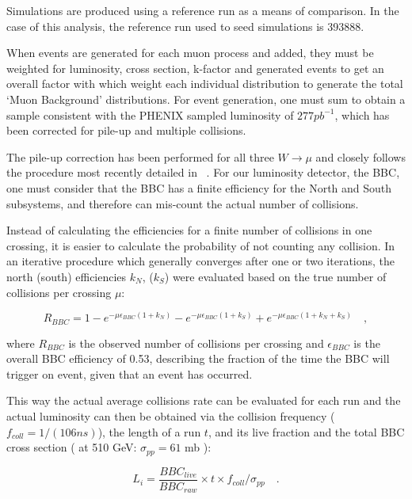 Simulations are produced using a reference run as a means of comparison. In the
case of this analysis, the reference run used to seed simulations is 393888.

When events are generated for each muon process and added, they must be weighted
for luminosity, cross section, k-factor and generated events to get an overall
factor with which weight each individual distribution to generate the total
`Muon Background' distributions. For event generation, one must sum to obtain a
sample consistent with the PHENIX sampled luminosity of $277 pb^{-1}$, which has
been corrected for pile-up and multiple collisions.

The pile-up correction has been performed for all three $W\rightarrow\mu$
and closely follows the procedure most recently detailed in ~\cite{Wolin2014}.
For our luminosity detector, the BBC, one must consider that the BBC has a
finite efficiency for the North and South subsystems, and therefore can
mis-count the actual number of collisions.

Instead of calculating the efficiencies for a finite number of collisions in
one crossing, it is easier to calculate the probability of not counting
any collision. In an iterative procedure which generally converges after one or
two iterations, the north (south) efficiencies $k_N$, ($k_S$) were evaluated
based on the true number of collisions per crossing $\mu$:

\begin{equation}
  R_{BBC} = 1 - e^{-\mu\epsilon_{BBC}(1+k_N)} - 
  e^{-\mu\epsilon_{BBC}(1+k_S)} + 
  e^{-\mu\epsilon_{BBC}(1+k_N+k_S)}\quad,
\end{equation}

{\noindent}where $R_{BBC}$ is the observed number of collisions per crossing and
$\epsilon_{BBC}$ is the overall BBC efficiency of 0.53, describing the fraction
of the time the BBC will trigger on event, given that an event has occurred.

This way the actual average collisions rate can be evaluated for each run and
the actual luminosity can then be obtained via the collision frequency (
$f_{coll} = 1/(106 ns)$), the length of a run $t$,  and its live fraction and
the total BBC cross section ( at 510 GeV: $\sigma_{pp} = 61$ mb ):

\begin{equation}
  L_i = \frac{BBC_{live}}{ BBC_{raw}} 
  \times t \times f_{coll} / 
  \sigma_{pp}\quad . 
\end{equation}

